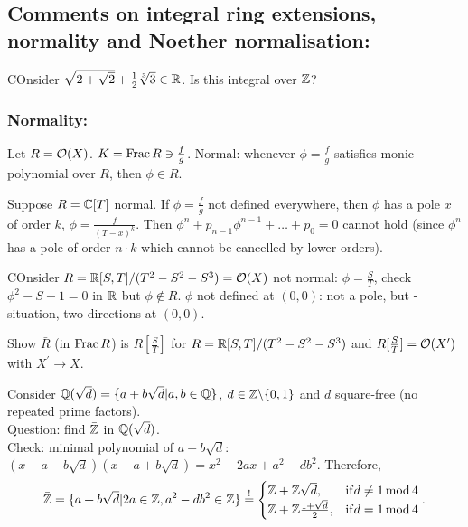 \documentclass[a4paper,11pt]{article}
\begin{document}
			{\color{gray}\subsection*{Comments on integral ring extensions, normality and Noether normalisation:}
			
				\begin{exc}
					COnsider $\sqrt{2+\sqrt{2}}+\frac{1}{2}\sqrt[3]{3}\in\mathbb{R}$. Is this integral over $\mathbb{Z}$?
				\end{exc}

				\subsubsection*{Normality:}

					Let $R=\mathcal{O}(X)$. $K=\operatorname{Frac} R\ni\frac{f}{g}$. Normal: whenever $\phi=\frac{f}{g}$ satisfies monic polynomial over $R$, then $\phi\in R$.

					\begin{eg}
						Suppose $R=\mathbb{C}[T]$ normal. If $\phi=\frac{f}{g}$ not defined everywhere, then $\phi$ has a pole $x$ of order $k$, $\phi=\frac{f}{(T-x)^k}$. Then $\phi^n+p_{n-1}\phi^{n-1}+\dots+p_0=0$ cannot hold (since $\phi^n$ has a pole of order $n\cdot k$ which cannot be cancelled by lower orders).
					\end{eg}

					\begin{eg}
						COnsider $R=\mathbb{R}[S,T]/(T^2-S^2-S^3)=\mathcal{O}(X)$ not normal: $\phi=\frac{S}{T}$, check $\phi^2-S-1=0$ in $\mathbb{R}$ but $\phi\notin R$. $\phi$ not defined at $(0,0)$: not a pole, but -situation, two directions at $(0,0)$.
					\end{eg}

					\begin{exc}
						Show $\bar{R}$ (in $\operatorname{Frac} R$) is $R[\frac{S}{T}]$ for $R=\mathbb{R}[S,T]/(T^2-S^2-S^3)$ and $R[\frac{S}{T}]=\mathcal{O}(X^\prime)$ with $X^\prime\rightarrow X$.
					\end{exc}

					\begin{eg}
						Consider $\mathbb{Q}(\sqrt{d})=\{a+b\sqrt{d}|a,b\in\mathbb{Q}\}$, $d\in\mathbb{Z}\backslash\{0,1\}$ and $d$ square-free (no repeated prime factors).\\ Question: find $\bar{\mathbb{Z}}$ in $\mathbb{Q}(\sqrt{d})$.\\
						Check: minimal polynomial of $a+b\sqrt{d}$: $(x-a-b\sqrt{d})(x-a+b\sqrt{d})=x^2-2ax+a^2-db^2$. Therefore,
						\begin{equation*}
							\bar{\mathbb{Z}}=\{a+b\sqrt{d}|2a\in\mathbb{Z},a^2-db^2\in\mathbb{Z}\}\overset{!}{=}\begin{cases}
								\mathbb{Z}+\mathbb{Z}\sqrt{d}, & \mathrm{if }d\neq 1\operatorname{mod} 4\\
								\mathbb{Z}+\mathbb{Z}\frac{1+\sqrt{d}}{2}, & \mathrm{if }d=1\operatorname{mod} 4
							\end{cases}.
						\end{equation*}
					\end{eg}

}
\end{document}
